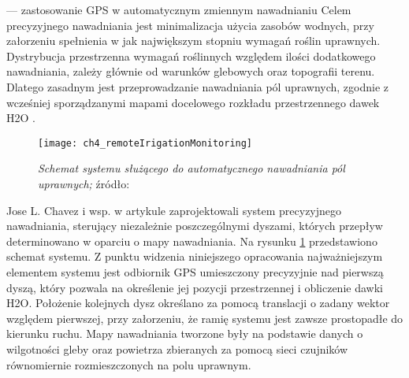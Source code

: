 --- zastosowanie GPS w automatycznym zmiennym nawadnianiu 
Celem precyzyjnego nawadniania jest minimalizacja użycia zasobów wodnych, przy załorzeniu  spełnienia w jak największym stopniu wymagań roślin uprawnych.
Dystrybucja przestrzenna wymagań roślinnych względem ilości dodatkowego nawadniania, zależy głównie od warunków glebowych oraz topografii terenu.
Dlatego zasadnym jest przeprowadzanie nawadniania pól uprawnych, zgodnie z wcześniej sporządzanymi mapami docelowego rozkładu przestrzennego dawek H2O 
\cite{PA_RemoteIrrigation}.
\begin{figure}[H]
\centering
\texttt{[image: ch4\_remoteIrigationMonitoring]}
\caption{\textit{Schemat systemu służącego do automatycznego nawadniania pól uprawnych;} źródło: \cite[][strona 04]{PA_RemoteIrrigation}}
\label{fig:ch4_remoteIrigationMonitoring}
\end{figure}
Jose L. Chavez i wsp. w artykule \cite{PA_RemoteIrrigation} zaprojektowali system precyzyjnego nawadniania, sterujący niezależnie poszczególnymi dyszami,
których przepływ determinowano w oparciu o mapy nawadniania. Na rysunku \ref{fig:ch4_remoteIrigationMonitoring} przedstawiono schemat systemu.
Z punktu widzenia niniejszego opracowania najważniejszym elementem systemu jest odbiornik GPS umieszczony precyzyjnie nad pierwszą dyszą,
który pozwala na określenie jej pozycji przestrzennej i obliczenie dawki H2O. Położenie kolejnych dysz określano za pomocą translacji
o zadany wektor względem pierwszej, przy załorzeniu, że ramię systemu jest zawsze prostopadłe do kierunku ruchu.
Mapy nawadniania tworzone były na podstawie danych o wilgotności gleby oraz powietrza zbieranych za pomocą sieci czujników
równomiernie rozmieszczonych na polu uprawnym. 





